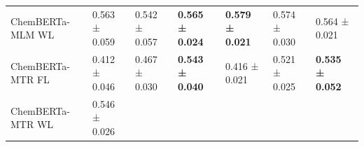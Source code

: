 \documentclass[
  10pt,
]{article}
\begin{document}
\begin{longtable}[]{@{}lllllll@{}}
\begin{minipage}[t]{0.12\columnwidth}
ChemBERTa-MLM WL\strut
\end{minipage} & \begin{minipage}[t]{0.12\columnwidth}\raggedright
0.563 ± 0.059\strut
\end{minipage} & \begin{minipage}[t]{0.12\columnwidth}\raggedright
0.542 ± 0.057\strut
\end{minipage} & \begin{minipage}[t]{0.12\columnwidth}\raggedright
\textbf{0.565 ± 0.024}\strut
\end{minipage} & \begin{minipage}[t]{0.12\columnwidth}\raggedright
\textbf{0.579 ± 0.021}\strut
\end{minipage} & \begin{minipage}[t]{0.12\columnwidth}\raggedright
0.574 ± 0.030\strut
\end{minipage} & \begin{minipage}[t]{0.12\columnwidth}\raggedright
0.564 ± 0.021\strut
\end{minipage}\tabularnewline
\begin{minipage}[t]{0.12\columnwidth}\raggedright
ChemBERTa-MTR FL\strut
\end{minipage} & \begin{minipage}[t]{0.12\columnwidth}\raggedright
0.412 ± 0.046\strut
\end{minipage} & \begin{minipage}[t]{0.12\columnwidth}\raggedright
0.467 ± 0.030\strut
\end{minipage} & \begin{minipage}[t]{0.12\columnwidth}\raggedright
\textbf{0.543 ± 0.040}\strut
\end{minipage} & \begin{minipage}[t]{0.12\columnwidth}\raggedright
0.416 ± 0.021\strut
\end{minipage} & \begin{minipage}[t]{0.12\columnwidth}\raggedright
0.521 ± 0.025\strut
\end{minipage} & \begin{minipage}[t]{0.12\columnwidth}\raggedright
\textbf{0.535 ± 0.052}\strut
\end{minipage}\tabularnewline
\begin{minipage}[t]{0.12\columnwidth}\raggedright
ChemBERTa-MTR WL\strut
\end{minipage} & \begin{minipage}[t]{0.12\columnwidth}\raggedright
0.546 ± 0.026\strut
\end{minipage} & \begin{minipage}[t]{0.12\columnwidth}\raggedright

\end{minipage}
\end{longtable}
\end{document}
